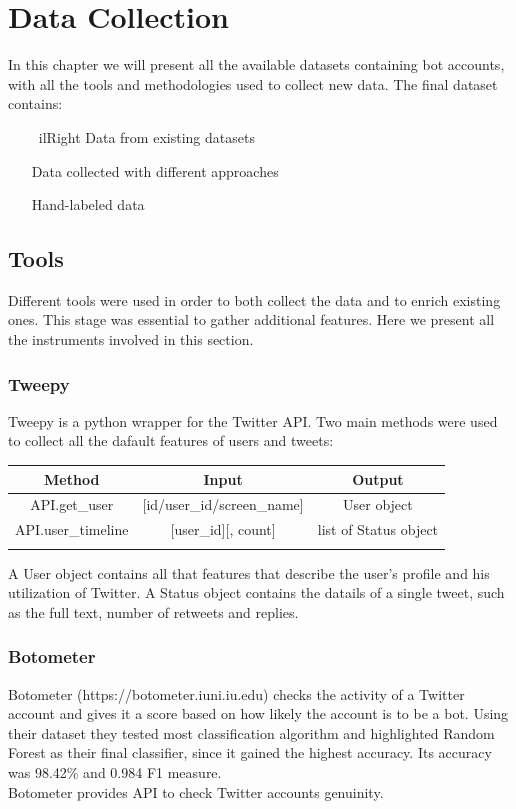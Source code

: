 \chapter{Data Collection}
\label{capitolo3}
\thispagestyle{empty}


In this chapter we will present all the available datasets containing bot accounts, with all the tools and methodologies used to collect new data. The final dataset contains:

\begin{itemize}
\item[\
ilRight]
Data from existing datasets
\item[\PencilRight]
Data collected with different approaches
\item[\PencilRight]
Hand-labeled data
\end{itemize}



\section{Tools}
Different tools were used in order to both collect the data and to enrich existing ones. This stage was essential to gather additional features. Here we present all the instruments involved in this section.

\subsection{Tweepy}
Tweepy is a python wrapper for the Twitter API.
Two main methods were used to collect all the dafault features of users and tweets:\\

\begin{tabular}{ccc}
\centering	
	Method&Input&Output\\ \hline\hline
	API.get\_user&[id/user\_id/screen\_name]&User object\\
	API.user\_timeline&[user\_id][, count]&list of Status object\\ \hline\\
\end{tabular}

A User object contains all that features that describe the user's profile and his utilization of Twitter.
A Status object contains the datails of a single tweet, such as the full text, number of retweets and replies.

\subsection{Botometer}
Botometer (https://botometer.iuni.iu.edu) checks the activity of a Twitter account and gives it a score based on how likely the account is to be a bot.
Using their dataset they tested most classification algorithm and highlighted Random Forest as their final classifier, since it gained the highest accuracy. Its accuracy was 98.42\% and 0.984 F1 measure\cite{Lee11sevenmonths}.
\\Botometer provides API to check Twitter accounts genuinity.

